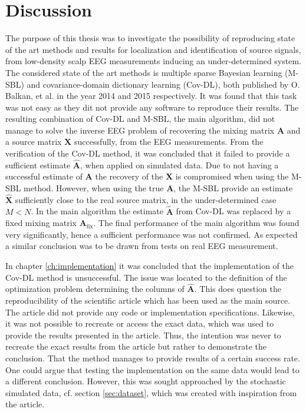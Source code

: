 \chapter{Discussion}
The purpose of this thesis was to investigate the possibility of reproducing state of the art methods and results for localization and identification of source signals, from low-density scalp EEG measurements inducing an under-determined system.
The considered state of the art methods is multiple sparse Bayesian learning (M-SBL)\cite{Balkan2014} and covariance-domain dictionary learning (Cov-DL)\cite{Balkan2015}, both published by O. Balkan, et al. in the year 2014 and 2015 respectively. 
It was found that this task was not easy as they dit not provide any software to reproduce their results. The resulting combination of Cov-DL and M-SBL, the main algorithm, did not manage to solve the inverse EEG problem of recovering the mixing matrix $\mathbf{A}$ and a source matrix $\mathbf{X}$ successfully, from the EEG measurements. 
From the verification of the Cov-DL method, it was concluded that it failed to provide a sufficient estimate $\hat{\mathbf{A}}$, when applied on simulated data. 
Due to not having a successful estimate of $\mathbf{A}$ the recovery of the $\mathbf{X}$ is compromised when using the M-SBL method.
However, when using the true $\mathbf{A}$, the M-SBL provide an estimate $\hat{\mathbf{X}}$ sufficiently close to the real source matrix, in the under-determined case $M < N$. 
In the main algorithm the estimate $\hat{\mathbf{A}}$ from Cov-DL was replaced by a fixed mixing matrix $\mathbf{A}_{\text{fix}}$. 
The final performance of the main algorithm was found very significantly, hence a sufficient performance was not confirmed. 
As expected a similar conclusion was to be drawn from tests on real EEG measurement. 

In chapter \ref{ch:implementation} it was concluded that the implementation of the Cov-DL method is unsuccessful.
The issue was located to the definition of the optimization problem determining the columns of $\hat{\mathbf{A}}$. 
This does question the reproducibility of the scientific article \cite{Balkan2015} which has been used as the main source. 
The article \cite{Balkan2015} did not provide any code or implementation specifications. 
Likewise, it was not possible to recreate or access the exact data, which was used to provide the results presented in the article. 
Thus, the intention was never to recreate the exact results from the article but rather to demonstrate the conclusion. That the method manages to provide results of a certain success rate. 
One could argue that testing the implementation on the same data would lead to a different conclusion. 
However, this was sought approached by the stochastic simulated data, cf. section \ref{sec:dataset}, which was created with inspiration from the article.

